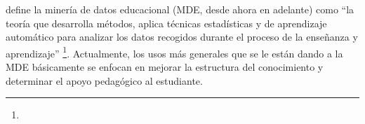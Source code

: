 \textcite[p.~9]{mining2012enhancing} define la minería de datos educacional (MDE, desde ahora en adelante) como “la teoría que desarrolla métodos, aplica técnicas estadísticas y de aprendizaje automático para analizar los datos recogidos durante el proceso de la enseñanza y aprendizaje” \footnote{\traduccionlibre}. Actualmente, los usos más generales que se le están dando a la MDE básicamente se enfocan en mejorar la estructura del conocimiento y determinar el apoyo pedagógico al estudiante.